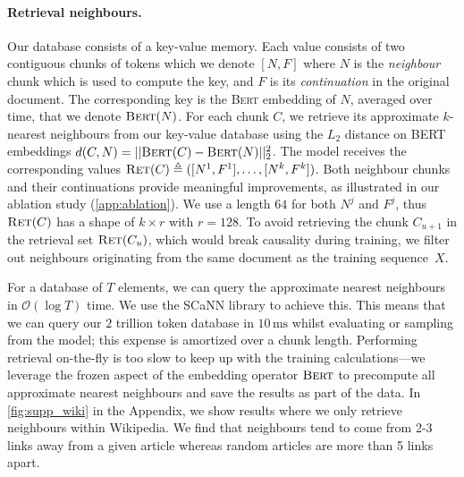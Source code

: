 \paragraph{Retrieval neighbours.} Our database consists of a key-value memory. Each value consists of two contiguous chunks of tokens which we denote $[N, F]$ where $N$ is the \textit{neighbour} chunk which is used to compute the key, and $F$ is its \textit{continuation} in the original document. The corresponding key is the \textsc{Bert} embedding of $N$, averaged over time, that we denote $\textsc{Bert}(N)$. For each chunk $C$, we retrieve its approximate $k$-nearest neighbours from our key-value database using the $L_2$ distance on BERT embeddings $d(C, N) = ||\textsc{Bert}(C) - \textsc{Bert}(N)||_2^2$. The model receives the corresponding values $\textsc{Ret}(C) \triangleq ([N^1, F^1], \dots,  [N^k, F^k])$. Both neighbour chunks and their continuations provide meaningful improvements, as illustrated in our ablation study (\autoref{app:ablation}). We use a length $64$ for both $N^j$ and $F^j$, thus $\textsc{Ret}(C)$ has a shape of $k \times r$ with $r=128$. To avoid retrieving the chunk $C_{u+1}$ in the retrieval set $\textsc{Ret}(C_u)$, which would break causality during training, we filter out neighbours originating from the same document as the training sequence~$X$.  

For a database of $T$ elements, we can query the approximate nearest neighbours in $\mathcal{O}(\log T)$ time. We use the SCaNN library \citep{avq_2020} to achieve this. This means that we can query our $2$ trillion token database in $10\,\textrm{ms}$ whilst evaluating or sampling from the model; this expense is amortized over a chunk length. Performing retrieval on-the-fly is too slow to keep up with the training calculations---we leverage the frozen aspect of the embedding operator $\textsc{Bert}$ to precompute all approximate nearest neighbours and save the results as part of the data. In \autoref{fig:supp_wiki} in the Appendix, we show results where we only retrieve neighbours within Wikipedia. We find that neighbours tend to come from 2-3 links away from a given article whereas random articles are more than 5 links apart.

